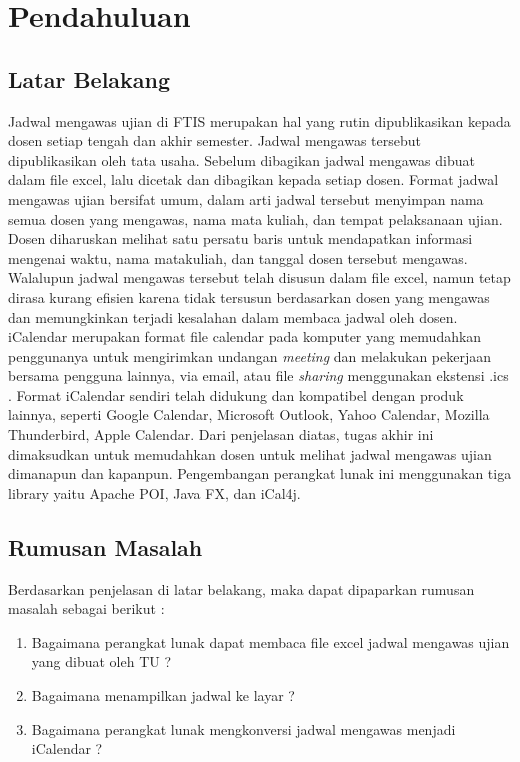 \chapter{Pendahuluan}
\label{chap:pendahuluan}

\section{Latar Belakang}
\label{sec:latar_belakang}

\indent Jadwal mengawas ujian di FTIS merupakan hal yang rutin dipublikasikan kepada dosen setiap tengah dan akhir semester. Jadwal mengawas tersebut dipublikasikan oleh tata usaha. Sebelum dibagikan jadwal mengawas dibuat dalam file excel, lalu dicetak dan dibagikan kepada setiap dosen. Format jadwal mengawas ujian bersifat umum, dalam arti jadwal tersebut menyimpan nama semua dosen yang mengawas, nama mata kuliah, dan tempat pelaksanaan ujian. Dosen diharuskan melihat satu persatu baris untuk mendapatkan informasi mengenai waktu, nama matakuliah, dan tanggal dosen tersebut mengawas. Walalupun jadwal mengawas tersebut telah disusun dalam file excel, namun tetap dirasa kurang efisien karena tidak tersusun berdasarkan dosen yang mengawas dan memungkinkan terjadi kesalahan dalam membaca jadwal oleh dosen. 
iCalendar merupakan format file calendar pada komputer yang memudahkan penggunanya untuk mengirimkan undangan \textit{meeting} dan melakukan pekerjaan bersama pengguna lainnya, via email, atau file \textit{sharing} menggunakan ekstensi .ics . Format iCalendar sendiri telah didukung dan kompatibel dengan produk lainnya, seperti Google Calendar, Microsoft Outlook, Yahoo Calendar, Mozilla Thunderbird, Apple Calendar.
Dari penjelasan diatas, tugas akhir ini dimaksudkan untuk memudahkan dosen untuk melihat jadwal mengawas ujian dimanapun dan kapanpun. Pengembangan perangkat lunak ini menggunakan tiga library yaitu Apache POI, Java FX, dan iCal4j.    

\section{Rumusan Masalah}
\label{sec:rumusan_masalah}

Berdasarkan penjelasan di latar belakang, maka dapat dipaparkan rumusan masalah sebagai berikut :
\begin{enumerate}
	\item Bagaimana perangkat lunak dapat membaca file excel jadwal mengawas ujian yang dibuat oleh TU ?
	\item Bagaimana menampilkan jadwal ke layar ?
	\item Bagaimana perangkat lunak mengkonversi jadwal mengawas menjadi iCalendar ? 
\end{enumerate}

